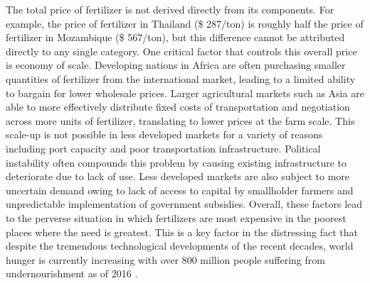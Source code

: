 The total price of fertilizer is not derived directly from its components. For example, the price of fertilizer in Thailand (\$ 287/ton) is roughly half the price of fertilizer in Mozambique (\$ 567/ton), but this difference cannot be attributed directly to any single category. One critical factor that controls this overall price is economy of scale. Developing nations in Africa are often purchasing smaller quantities of fertilizer from the international market, leading to a limited ability to bargain for lower wholesale prices.\cite{Wanzala2013} Larger agricultural markets such as Asia are able to more effectively distribute fixed costs of transportation and negotiation across more units of fertilizer, translating to lower prices at the farm scale. This scale-up is not possible in less developed markets for a variety of reasons including port capacity and poor transportation infrastructure. Political instability often compounds this problem by causing existing infrastructure to deteriorate due to lack of use. Less developed markets are also subject to more uncertain demand owing to lack of access to capital by smallholder farmers and unpredictable implementation of government subsidies. Overall, these factors lead to the perverse situation in which fertilizers are most expensive in the poorest places where the need is greatest. This is a key factor in the distressing fact that despite the tremendous technological developments of the recent decades, world hunger is currently increasing with over 800 million people suffering from undernourishment as of 2016 \cite{FAO_2017}.


